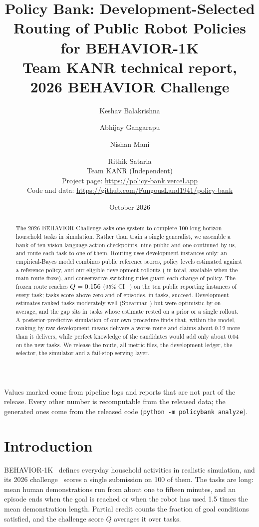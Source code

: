 \documentclass[10pt]{article}
\title{\textbf{Policy Bank: Development-Selected Routing of Public Robot Policies for BEHAVIOR-1K}\\[4pt]
\large Team KANR technical report, 2026 BEHAVIOR Challenge}
\author{Keshav Balakrishna \and Abhijay Gangarapu \and Nishan Mani \and Rithik Satarla\\[2pt]
\normalsize Team KANR (Independent)\\
\normalsize Project page: \url{https://policy-bank.vercel.app}\\
\normalsize Code and data: \url{https://github.com/FungousLand1941/policy-bank}}
\date{October 2026}
\newcommand{\Q}{\ensuremath{Q}}
\newcommand{\code}[1]{\texttt{#1}}
\newcommand{\pl}{\textsuperscript{\dag}}
\begin{document}
\maketitle

\begin{abstract}
\noindent
The 2026 BEHAVIOR Challenge asks one system to complete 100 long-horizon household tasks in simulation. Rather than train a single generalist, we assemble a bank of ten vision-language-action checkpoints, nine public and one continued by us, and route each task to one of them. Routing uses development instances only: an empirical-Bayes model combines public reference scores, policy levels estimated against a reference policy, and our eligible development rollouts (\DevEligible{} in total, \DevAtFreeze{} available when the main route froze), and conservative switching rules guard each change of policy. The frozen route reaches $\Q=\Qval$ (95\% CI \Qlo--\Qhi) on the ten public reporting instances of every task; \Nnonzero{} tasks score above zero and \Nsuccess{} of \Nepisodes{} episodes, in \Ntaskssuccess{} tasks, succeed. Development estimates ranked tasks moderately well (Spearman \Spearman) but were optimistic by \OptimismGap{} on average, and the gap sits in tasks whose estimate rested on a prior or a single rollout. A posterior-predictive simulation of our own procedure finds that, within the model, ranking by raw development means delivers a worse route and claims about 0.12 more than it delivers, while perfect knowledge of the candidates would add only about 0.04 on the new tasks. We release the route, all \Nepisodes{} metric files, the development ledger, the selector, the simulator and a fail-stop serving layer.
\end{abstract}

{\small\noindent Values marked \pl{} come from pipeline logs and reports that are not part of the release. Every other number is recomputable from the released data; the generated ones come from the released code (\code{python -m policybank analyze}).\par}

\section{Introduction}

BEHAVIOR-1K~\cite{li2024behavior1k,li2023behavior1k} defines everyday household activities in realistic simulation, and its 2026 challenge~\cite{behavior2026challenge} scores a single submission on 100 of them. The tasks are long: mean human demonstrations run from about one to fifteen minutes, and an episode ends when the goal is reached or when the robot has used 1.5 times the mean demonstration length. Partial credit counts the fraction of goal conditions satisfied, and the challenge score \Q{} averages it over tasks.
\end{document}
